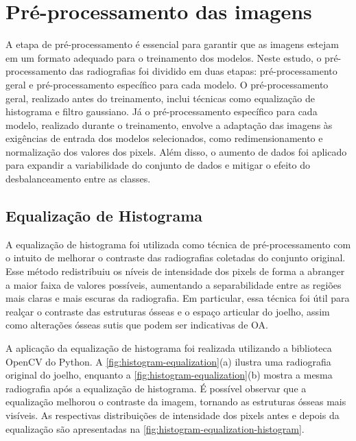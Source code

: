 \section{Pré-processamento das imagens}

A etapa de pré-processamento é essencial para garantir que as imagens estejam em um formato adequado para o treinamento dos modelos. Neste estudo, o pré-processamento das radiografias foi dividido em duas etapas: pré-processamento geral e pré-processamento específico para cada modelo. O pré-processamento geral, realizado antes do treinamento, inclui técnicas como equalização de histograma e filtro gaussiano. Já o pré-processamento específico para cada modelo, realizado durante o treinamento, envolve a adaptação das imagens às exigências de entrada dos modelos selecionados, como redimensionamento e normalização dos valores dos pixels. Além disso, o aumento de dados foi aplicado para expandir a variabilidade do conjunto de dados e mitigar o efeito do desbalanceamento entre as classes.

\subsection{Equalização de Histograma}

A equalização de histograma foi utilizada como técnica de pré-processamento com o intuito de melhorar o contraste das radiografias coletadas do conjunto original. Esse método redistribuiu os níveis de intensidade dos pixels de forma a abranger a maior faixa de valores possíveis, aumentando a separabilidade entre as regiões mais claras e mais escuras da radiografia. Em particular, essa técnica foi útil para realçar o contraste das estruturas ósseas e o espaço articular do joelho, assim como alterações ósseas sutis que podem ser indicativas de OA.

A aplicação da equalização de histograma foi realizada utilizando a biblioteca OpenCV \citep{opencv} do Python. A \autoref{fig:histogram-equalization}(a) ilustra uma radiografia original do joelho, enquanto a \autoref{fig:histogram-equalization}(b) mostra a mesma radiografia após a equalização de histograma. É possível observar que a equalização melhorou o contraste da imagem, tornando as estruturas ósseas mais visíveis. As respectivas distribuições de intensidade dos pixels antes e depois da equalização são apresentadas na \autoref{fig:histogram-equalization-histogram}.

